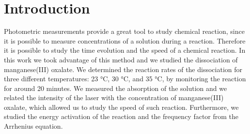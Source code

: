 \documentclass[a4paper,10pt]{article}
\begin{document}
\section{Introduction}
Photometric measurements provide a great tool to study chemical reaction, since it is possible to measure concentrations of a solution during a reaction. Therefore it is possible to study the time evolution and the speed of a chemical reaction. In this work we took advantage of this method and we studied the dissociation of manganese(III) oxalate. We determined the reaction rates of the dissociation for three different temperatures: 23 °C, 30 °C, and 35 °C, by monitoring the reaction for around 20 minutes. We measured the absorption of the solution and we related the intensity of the laser with the concentration of manganese(III) oxalate, which allowed us to study the speed of such reaction. Furthermore, we studied the energy activation of the reaction and the frequency factor from the Arrhenius equation.
\end{document}

